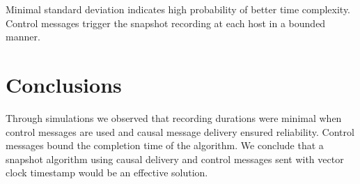 \documentclass[12pt]{article}
\begin{document}
Minimal standard deviation indicates high probability of better time complexity. Control messages trigger the snapshot recording at each host in a bounded manner. 



\section{Conclusions}
Through simulations we observed that recording durations were minimal when control messages are used and causal message delivery ensured reliability. Control messages bound the completion time of the algorithm. We conclude that a snapshot algorithm using causal delivery and control messages sent with vector clock timestamp would be an effective solution.



\end{document}
